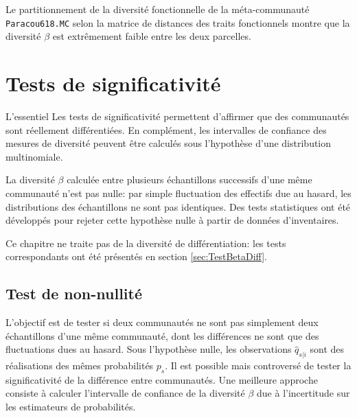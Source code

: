 \documentclass[
  11pt,
  french,
  a4paper,
  extrafontsizes,onecolumn,openright
  ]{memoir}
\newenvironment{Essentiel}
  {\begin{bclogo}[logo=\bctrombone, noborder=true, couleur=lightgray!50]{L'essentiel}\parindent0pt}
  {\end{bclogo}}
\begin{document}
\normalsize

Le partitionnement de la diversité fonctionnelle de la méta-communauté \texttt{Paracou618.MC} selon la matrice de distances des traits fonctionnels montre que la diversité \(\beta\) est extrêmement faible entre les deux parcelles.

\hypertarget{tests-de-significativituxe9}{%
\chapter{Tests de significativité}\label{tests-de-significativituxe9}}

\scriptsize

\begin{Essentiel}
Les tests de significativité permettent d'affirmer que des communautés
sont réellement différentiées. En complément, les intervalles de
confiance des mesures de diversité peuvent être calculés sous
l'hypothèse d'une distribution multinomiale.
\end{Essentiel}

\normalsize

La diversité \(\beta\) calculée entre plusieurs échantillons successifs d'une même communauté n'est pas nulle: par simple fluctuation des effectifs due au hasard, les distributions des échantillons ne sont pas identiques.
Des tests statistiques ont été développés pour rejeter cette hypothèse nulle à partir de données d'inventaires.

Ce chapitre ne traite pas de la diversité de différentiation: les tests correspondants ont été présentés en section \ref{sec:TestBetaDiff}.

\hypertarget{test-de-non-nullituxe9-1}{%
\section{Test de non-nullité}\label{test-de-non-nullituxe9-1}}

L'objectif est de tester si deux communautés ne sont pas simplement deux échantillons d'une même communauté, dont les différences ne sont que des fluctuations dues au hasard.
Sous l'hypothèse nulle, les observations \(\hat{q}_{s|i}\) sont des réalisations des mêmes probabilités \(p_s\).
Il est possible \autocite{Crist2003} mais controversé \autocite{Jones1986} de tester la significativité de la différence entre communautés.
Une meilleure approche consiste à calculer l'intervalle de confiance de la diversité \(\beta\) due à l'incertitude sur les estimateurs de probabilités.
\end{document}
